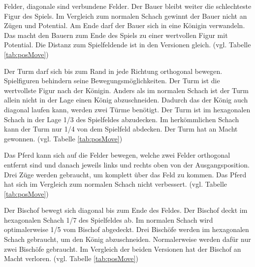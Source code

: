 Felder, diagonale sind verbundene Felder.
\newpage
Der Bauer bleibt weiter die schlechteste Figur des Spiels. Im Vergleich zum normalen Schach gewinnt der Bauer nicht an Zügen und Potential. Am Ende darf der Bauer sich in eine Königin verwandeln. Das macht den Bauern zum Ende des Spiels zu einer wertvollen Figur mit Potential. Die Distanz zum Spielfeldende ist in den Versionen gleich.\cite{GlinskiHexaChess} (vgl. Tabelle \ref{tab:posMove})\par
Der Turm darf sich bis zum Rand in jede Richtung orthogonal bewegen. Spielfiguren behindern seine Bewegungsmöglichkeiten. Der Turm ist die wertvollste Figur nach der Königin. Anders als im normalen Schach ist der Turm allein nicht in der Lage einen König abzuschneiden. Dadurch das der König auch diagonal laufen kann, werden zwei Türme benötigt. Der Turm ist im hexagonalen Schach in der Lage 1/3 des Spielfeldes abzudecken. Im herkömmlichen Schach kann der Turm nur 1/4 von dem Spielfeld abdecken. Der Turm hat an Macht gewonnen. \cite{GlinskiHexaChess} (vgl. Tabelle \ref{tab:posMove})\par
Das Pferd kann sich auf die Felder bewegen, welche zwei Felder orthogonal entfernt sind und danach jeweils links und rechts oben von der Ausgangsposition. Drei Züge werden gebraucht, um komplett über das Feld zu kommen. Das Pferd hat sich im Vergleich zum normalen Schach nicht verbessert. \cite{GlinskiHexaChess} (vgl. Tabelle \ref{tab:posMove})\par
Der Bischof bewegt sich diagonal bis zum Ende des Feldes. Der Bischof deckt im hexagonalen Schach 1/7 des Spielfeldes ab. Im normalen Schach wird optimalerweise 1/5 vom Bischof abgedeckt. Drei Bischöfe werden im hexagonalen Schach gebraucht, um den König abzuschneiden. Normalerweise werden dafür nur zwei Bischöfe gebraucht. Im Vergleich der beiden Versionen hat der Bischof an Macht verloren. \cite{GlinskiHexaChess} (vgl. Tabelle \ref{tab:posMove})\par
